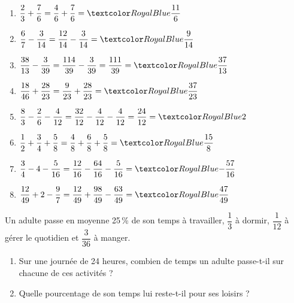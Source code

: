 \begin{Maquette}[Fiche,CorrigeFin,Colonnes=2]{}
\begin{multicols}{2}
      \begin{Solution}
         \begin{enumerate}
            \item $\dfrac23+\dfrac76 =\dfrac46+\dfrac76 =\cor{\dfrac{11}6}$
            \item $\dfrac67-\dfrac3{14} =\dfrac{12}{14}-\dfrac3{14} =\cor{\dfrac9{14}}$
            \item $\dfrac{38}{13}-\dfrac3{39} =\dfrac{114}{39}-\dfrac3{39} =\dfrac{111}{39} =\cor{\dfrac{37}{13}}$
            \item $\dfrac{18}{46}+\dfrac{28}{23} =\dfrac{9}{23}+\dfrac{28}{23} =\cor{\dfrac{37}{23}}$
            \item $\dfrac83-\dfrac26-\dfrac4{12} =\dfrac{32}{12}-\dfrac{4}{12}-\dfrac{4}{12} =\dfrac{24}{12} =\cor{2}$
            \item $\dfrac12+\dfrac34+\dfrac58 =\dfrac48+\dfrac68+\dfrac58 =\cor{\dfrac{15}{8}}$
            \item $\dfrac34-4-\dfrac5{16} =\dfrac{12}{16}-\dfrac{64}{16}-\dfrac{5}{16} =\cor{-\dfrac{57}{16}}$
            \item $\dfrac{12}{49}+2-\dfrac97 =\dfrac{12}{49}+\dfrac{98}{49}-\dfrac{63}{49} =\cor{\dfrac{47}{49}}$
         \end{enumerate}
      \end{Solution}

      
      \begin{exercice}[Dur] %
         Un adulte passe en moyenne 25\,\% de son temps à travailler, $\dfrac13$ à dormir, $\dfrac{1}{12}$ à gérer le quotidien et $\dfrac{3}{36}$ à manger.
         \begin{enumerate}
            \item Sur une journée de 24 heures, combien de temps un adulte passe-t-il sur chacune de ces activités ?
            \item Quelle pourcentage de son temps lui reste-t-il pour ses loisirs ?
         \end{enumerate}
      \end{exercice}
      

\end{multicols}
\end{Maquette}
